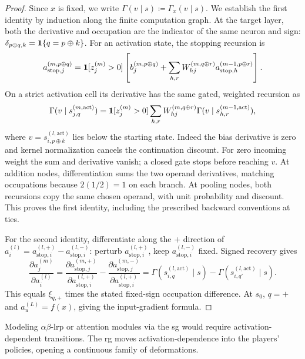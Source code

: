 \begin{proof}
Since $x$ is fixed, we write $\Gamma(v\mid s)\coloneqq\Gamma_x(v\mid s)$. We establish the first identity by induction along the finite computation graph. At the target layer, both the derivative and occupation are the indicator
of the same neuron and sign: $\delta_{p\oplus q,k}=\mathbf{1}\{q=p\oplus k\}$.
For an activation state, the stopping recursion is
\begin{equation}\label{ptnb:eq:adf-astop-recursion}
 a_{\mathrm{stop},j}^{(m,p\oplus q)}
 =\mathbf{1}[z_j^{(m)}>0]\left[b_j^{(m,p\oplus q)}+
 \sum_{h,r}W_{hj}^{(m,q\oplus r)}a_{\mathrm{stop},h}^{(m-1,p\oplus r)}\right].
\end{equation}
On a strict activation cell its derivative has the same gated, weighted recursion as
\[
 \Gamma(v\mid s_{j,q}^{(m,\mathrm{act})})
 =\mathbf{1}[z_j^{(m)}>0]\sum_{h,r}W_{hj}^{(m,q\oplus r)}
       \Gamma(v\mid s_{h,r}^{(m-1,\mathrm{act})}),
\]
where $v=s_{i,p\oplus k}^{(l,\mathrm{act})}$ lies below the starting state.
Indeed the bias derivative is zero and kernel normalization cancels the continuation discount.
For zero incoming weight the sum and derivative vanish; a closed gate stops before reaching $v$.
At addition nodes, differentiation sums the two operand derivatives, matching occupations because
$2(1/2)=1$ on each branch. At pooling nodes, both recursions copy the same chosen operand, with
unit probability and discount. This proves the first identity, including the prescribed backward
conventions at ties.

For the second identity, differentiate along the $+$ direction of $a_i^{(l)}=a_{\mathrm{stop},i}^{(l,+)}-
 a_{\mathrm{stop},i}^{(l,-)}$: perturb $a_{\mathrm{stop},i}^{(l,+)}$, keep $a_{\mathrm{stop},i}^{(l,-)}$ fixed. Signed recovery gives
\[
 \frac{\partial a_j^{(m)}}{\partial a_i^{(l)}}
 =\frac{\partial a_{\mathrm{stop},j}^{(m,+)}}{\partial a_{\mathrm{stop},i}^{(l,+)}}
  -\frac{\partial a_{\mathrm{stop},j}^{(m,-)}}{\partial a_{\mathrm{stop},i}^{(l,+)}}
 =\Gamma(s_{i,q}^{(l,\mathrm{act})}\mid s)-\Gamma(s_{i,q'}^{(l,\mathrm{act})}\mid s).
\]
This equals $\xi_{q,+}$ times the stated fixed-sign occupation difference. At $s_0$,
$q=+$ and $a_u^{(L)}=f(x)$, giving the input-gradient formula.
\end{proof}

Modeling $\alpha\beta$-\ac{lrp} or attention modules via the \ac{sg} would require
activation-dependent transitions. The \ac{rg} moves activation-dependence into the players'
policies, opening a continuous family of deformations.

